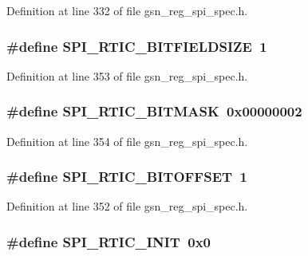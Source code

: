 Definition at line 332 of file gsn\_\-reg\_\-spi\_\-spec.h.

\hypertarget{a00573_aab6fa54aaf63d9dc65666692e91348f9}{
\subsubsection[{SPI\_\-RTIC\_\-BITFIELDSIZE}]{\setlength{\rightskip}{0pt plus 5cm}\#define SPI\_\-RTIC\_\-BITFIELDSIZE~1}}
\label{a00573_aab6fa54aaf63d9dc65666692e91348f9}


Definition at line 353 of file gsn\_\-reg\_\-spi\_\-spec.h.

\hypertarget{a00573_a2807b2e4ea98c1ab83dcd2730a635531}{
\subsubsection[{SPI\_\-RTIC\_\-BITMASK}]{\setlength{\rightskip}{0pt plus 5cm}\#define SPI\_\-RTIC\_\-BITMASK~0x00000002}}
\label{a00573_a2807b2e4ea98c1ab83dcd2730a635531}


Definition at line 354 of file gsn\_\-reg\_\-spi\_\-spec.h.

\hypertarget{a00573_ad4ff566b6cecfc9973238637da78fe52}{
\subsubsection[{SPI\_\-RTIC\_\-BITOFFSET}]{\setlength{\rightskip}{0pt plus 5cm}\#define SPI\_\-RTIC\_\-BITOFFSET~1}}
\label{a00573_ad4ff566b6cecfc9973238637da78fe52}


Definition at line 352 of file gsn\_\-reg\_\-spi\_\-spec.h.

\hypertarget{a00573_abab0e0a8f14a20e6339b64ae18ea5f53}{
\subsubsection[{SPI\_\-RTIC\_\-INIT}]{\setlength{\rightskip}{0pt plus 5cm}\#define SPI\_\-RTIC\_\-INIT~0x0}}
\label{a00573_abab0e0a8f14a20e6339b64ae18ea5f53}


